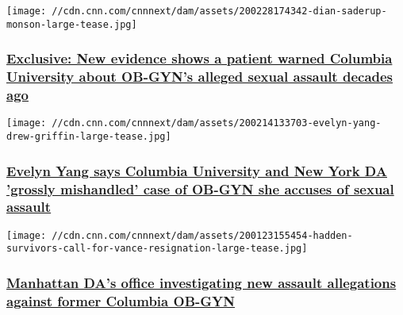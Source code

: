 \href{/2020/02/28/politics/columbia-sexual-assault-letter-warning-invs/index.html}{}

\texttt{[image: //cdn.cnn.com/cnnnext/dam/assets/200228174342-dian-saderup-monson-large-tease.jpg]}

\hypertarget{exclusive-new-evidence-shows-a-patient-warned-columbia-university-about-ob-gyns-alleged-sexual-assault-decades-ago}{%
\subsubsection{\texorpdfstring{\href{/2020/02/28/politics/columbia-sexual-assault-letter-warning-invs/index.html}{Exclusive:
New evidence shows a patient warned Columbia University about OB-GYN's
alleged sexual assault decades
ago}}{Exclusive: New evidence shows a patient warned Columbia University about OB-GYN's alleged sexual assault decades ago}}\label{exclusive-new-evidence-shows-a-patient-warned-columbia-university-about-ob-gyns-alleged-sexual-assault-decades-ago}}

\href{/2020/02/21/politics/evelyn-yang-marissa-hoechstetter-vance-invs/index.html}{}

\texttt{[image: //cdn.cnn.com/cnnnext/dam/assets/200214133703-evelyn-yang-drew-griffin-large-tease.jpg]}

\hypertarget{evelyn-yang-says-columbia-university-and-new-york-da-grossly-mishandled-case-of-ob-gyn-she-accuses-of-sexual-assault}{%
\subsubsection{\texorpdfstring{\href{/2020/02/21/politics/evelyn-yang-marissa-hoechstetter-vance-invs/index.html}{Evelyn
Yang says Columbia University and New York DA 'grossly mishandled' case
of OB-GYN she accuses of sexual
assault}}{Evelyn Yang says Columbia University and New York DA 'grossly mishandled' case of OB-GYN she accuses of sexual assault}}\label{evelyn-yang-says-columbia-university-and-new-york-da-grossly-mishandled-case-of-ob-gyn-she-accuses-of-sexual-assault}}

\href{/2020/02/21/politics/hadden-columbia-investigation-invs/index.html}{}

\texttt{[image: //cdn.cnn.com/cnnnext/dam/assets/200123155454-hadden-survivors-call-for-vance-resignation-large-tease.jpg]}

\hypertarget{manhattan-das-office-investigating-new-assault-allegations-against-former-columbia-ob-gyn}{%
\subsubsection{\texorpdfstring{\href{/2020/02/21/politics/hadden-columbia-investigation-invs/index.html}{Manhattan
DA's office investigating new assault allegations against former
Columbia
OB-GYN}}{Manhattan DA's office investigating new assault allegations against former Columbia OB-GYN}}\label{manhattan-das-office-investigating-new-assault-allegations-against-former-columbia-ob-gyn}}

